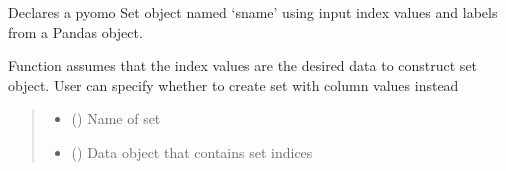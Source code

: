 \documentclass[letterpaper,10pt,english]{sphinxmanual}
\begin{document}
\begin{fulllineitems}
\begin{fulllineitems}
\begin{quote}
\begin{description}
\end{description}\end{quote}

\end{fulllineitems}


\begin{fulllineitems}
\label{\detokenize{src.common.model:src.common.model.Model._declare_set_with_pandas}}
\pysigstartsignatures
\pysiglinewithargsret
{}
{\sphinxparamcomma {}\sphinxparamcomma {}\sphinxparamcomma {}\sphinxparamcomma {}}
{}
\pysigstopsignatures
\sphinxAtStartPar
Declares a pyomo Set object named ‘sname’ using input index values and labels from a
Pandas object.

\sphinxAtStartPar
Function assumes that the index values are the desired data to construct set object. User
can specify whether to create set with column values instead
\begin{quote}\begin{description}
\begin{itemize}
\item {} 
\sphinxAtStartPar
{} () \textendash{} Name of set

\item {} 
\sphinxAtStartPar
{} (\sphinxstyleliteralemphasis{\sphinxupquote{ | }}) \textendash{} Data object that contains set indices


\end{itemize}
\end{description}
\end{quote}
\end{fulllineitems}
\end{fulllineitems}
\end{document}

